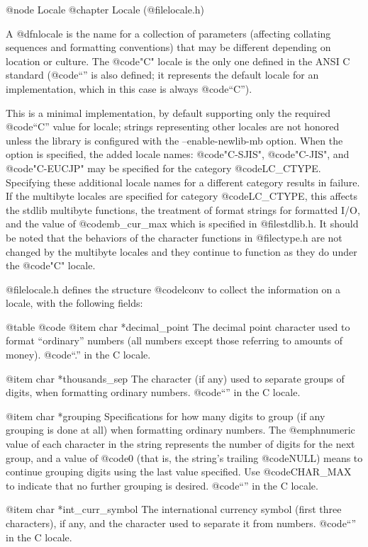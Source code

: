 @node Locale
@chapter Locale (@file{locale.h})

A @dfn{locale} is the name for a collection of parameters (affecting
collating sequences and formatting conventions) that may be different
depending on location or culture.  The @code{"C"} locale is the only
one defined in the ANSI C standard (@code{``''} is also defined;
it represents the default locale for an implementation, which in this
case is always @code{``C''}).

This is a minimal implementation, by default supporting only the required @code{``C''}
value for locale; strings representing other locales are not
honored unless the library is configured with the --enable-newlib-mb option.
When the option is specified, the added locale names: @code{"C-SJIS"}, @code{"C-JIS"},
and @code{"C-EUCJP"} may be specified for the category @code{LC_CTYPE}.  Specifying
these additional locale names for a different category results in failure.
If the multibyte locales are specified for category @code{LC_CTYPE}, this affects
the stdlib multibyte functions, the treatment of format strings for formatted
I/O, and the value of @code{mb_cur_max} which
is specified in @file{stdlib.h}.  It should be noted that the behaviors of
the character functions in @file{ctype.h} are not changed by the multibyte
locales and they continue to function as they do under the @code{"C"} locale.
 
@file{locale.h} defines the structure @code{lconv} to collect the
information on a locale, with the following fields:

@table @code
@item char *decimal_point
The decimal point character used to format ``ordinary'' numbers (all
numbers except those referring to amounts of money).  @code{``.''} in the
C locale. 

@item char *thousands_sep
The character (if any) used to separate groups of digits, when
formatting ordinary numbers.
@code{``''} in the C locale.

@item char *grouping
Specifications for how many digits to group (if any grouping is done at
all) when formatting ordinary numbers.  The @emph{numeric value} of each
character in the string represents the number of digits for the next
group, and a value of @code{0} (that is, the string's trailing
@code{NULL}) means to continue grouping digits using the last value
specified.  Use @code{CHAR_MAX} to indicate that no further grouping is
desired.  @code{``''} in the C locale. 

@item char *int_curr_symbol
The international currency symbol (first three characters), if any, and
the character used to separate it from numbers.
@code{``''} in the C locale.

